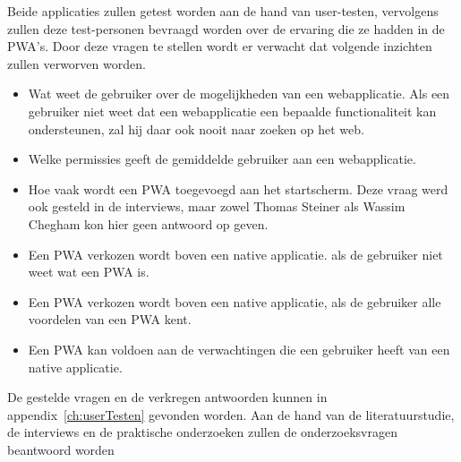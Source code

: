 Beide applicaties zullen getest worden aan de hand van user-testen, vervolgens zullen deze test-personen bevraagd worden over de ervaring die ze hadden in de PWA's.
Door deze vragen te stellen wordt er verwacht dat volgende inzichten zullen verworven worden.
\begin{itemize}
	\item Wat weet de gebruiker over de mogelijkheden van een webapplicatie. Als een gebruiker niet weet dat een webapplicatie een bepaalde functionaliteit kan ondersteunen, zal hij daar ook nooit naar zoeken op het web.
	\item Welke permissies geeft de gemiddelde gebruiker aan een webapplicatie.
	\item Hoe vaak wordt een PWA toegevoegd aan het startscherm. Deze vraag werd ook gesteld in de interviews, maar zowel Thomas Steiner als Wassim Chegham kon hier geen antwoord op geven.
	\item Een PWA verkozen wordt boven een native applicatie. als de gebruiker niet weet wat een PWA is.
	\item Een PWA verkozen wordt boven een native applicatie, als de gebruiker alle voordelen van een PWA kent.	
	\item Een PWA kan voldoen aan de verwachtingen die een gebruiker heeft van een native applicatie.
\end{itemize}

De gestelde vragen en de verkregen antwoorden kunnen in appendix~\ref{ch:userTesten} gevonden worden.
Aan de hand van de literatuurstudie, de interviews en de praktische onderzoeken zullen de onderzoeksvragen beantwoord worden

